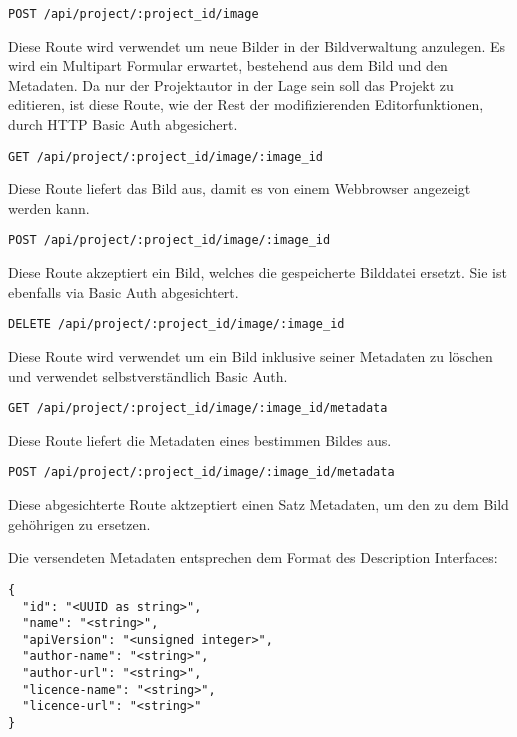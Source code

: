 \begin{verbatim}
POST /api/project/:project_id/image
\end{verbatim}

Diese Route wird verwendet um neue Bilder in der Bildverwaltung anzulegen. Es
wird ein Multipart Formular erwartet, bestehend aus dem Bild und den Metadaten.
Da nur der Projektautor in der Lage sein soll das Projekt zu editieren, ist
diese Route, wie der Rest der modifizierenden Editorfunktionen, durch HTTP Basic
Auth abgesichert.

\begin{verbatim}
GET /api/project/:project_id/image/:image_id
\end{verbatim}

Diese Route liefert das Bild aus, damit es von einem Webbrowser angezeigt werden kann.

\begin{verbatim}
POST /api/project/:project_id/image/:image_id
\end{verbatim}

Diese Route akzeptiert ein Bild, welches die gespeicherte Bilddatei ersetzt.
Sie ist ebenfalls via Basic Auth abgesichtert.

\begin{verbatim}
DELETE /api/project/:project_id/image/:image_id
\end{verbatim}

Diese Route wird verwendet um ein Bild inklusive seiner Metadaten zu löschen und
verwendet selbstverständlich Basic Auth.

\begin{verbatim}
GET /api/project/:project_id/image/:image_id/metadata
\end{verbatim}

Diese Route liefert die Metadaten eines bestimmen Bildes aus.

\begin{verbatim}
POST /api/project/:project_id/image/:image_id/metadata
\end{verbatim}

Diese abgesichterte Route aktzeptiert einen Satz Metadaten, um den zu dem Bild
gehöhrigen zu ersetzen.

Die versendeten Metadaten entsprechen dem Format des Description Interfaces:

\begin{verbatim}
{
  "id": "<UUID as string>",
  "name": "<string>",
  "apiVersion": "<unsigned integer>",
  "author-name": "<string>",
  "author-url": "<string>",
  "licence-name": "<string>",
  "licence-url": "<string>"
}
\end{verbatim}

